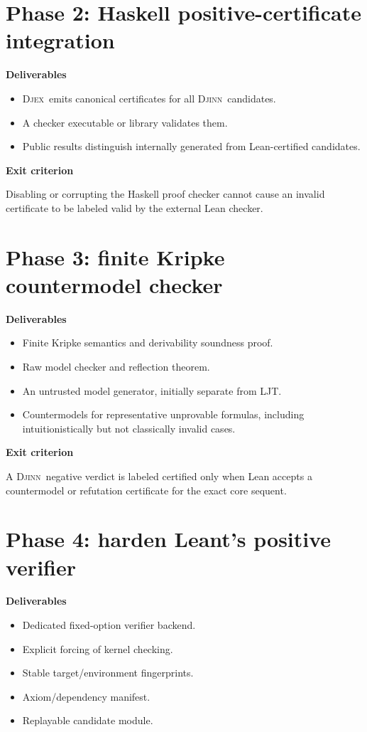 \documentclass[11pt,letterpaper,openany]{report}
\theoremstyle{definition}
\theoremstyle{remark}
\newcommand{\Djex}{\textsc{Djex}}
\newcommand{\Djinn}{\textsc{Djinn}}
\begin{document}
\section{Phase 2: Haskell positive-certificate integration}

\textbf{Deliverables}
\begin{itemize}
\item \Djex\ emits canonical certificates for all \Djinn\ candidates.
\item A checker executable or library validates them.
\item Public results distinguish internally generated from Lean-certified candidates.
\end{itemize}

\textbf{Exit criterion}

Disabling or corrupting the Haskell proof checker cannot cause an invalid certificate to be labeled valid by the external Lean checker.

\section{Phase 3: finite Kripke countermodel checker}

\textbf{Deliverables}
\begin{itemize}
\item Finite Kripke semantics and derivability soundness proof.
\item Raw model checker and reflection theorem.
\item An untrusted model generator, initially separate from LJT.
\item Countermodels for representative unprovable formulas, including intuitionistically but not classically invalid cases.
\end{itemize}

\textbf{Exit criterion}

A \Djinn\ negative verdict is labeled certified only when Lean accepts a countermodel or refutation certificate for the exact core sequent.

\section{Phase 4: harden Leant's positive verifier}

\textbf{Deliverables}
\begin{itemize}
\item Dedicated fixed-option verifier backend.
\item Explicit forcing of kernel checking.
\item Stable target/environment fingerprints.
\item Axiom/dependency manifest.
\item Replayable candidate module.
\end{itemize}
\end{document}
